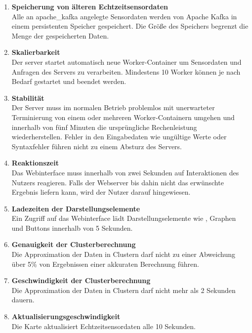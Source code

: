 \begin{enumerate}[label=\textbf{NF\arabic{enumi}0}]
	\item \textbf{Speicherung von älteren Echtzeitsensordaten}\\
	Alle an \gls{apache_kafka} angelegte Sensordaten werden von Apache Kafka in einem persistenten Speicher gespeichert. Die Größe des Speichers begrenzt die Menge der gespeicherten Daten.
	
	\item \textbf{Skalierbarkeit}\\
	Der \gls{server} startet automatisch neue Worker-Container um Sensordaten und Anfragen des Servers zu verarbeiten. Mindestens 10 Worker können je nach Bedarf gestartet und beendet werden.
	
	\item \textbf{Stabilität}\\  
	Der Server muss im normalen Betrieb problemlos mit unerwarteter Terminierung von einem oder mehreren Worker-Containern umgehen und innerhalb von fünf Minuten die ursprüngliche Rechenleistung wiederherstellen. Fehler in den Eingabedaten wie ungültige Werte oder Syntaxfehler führen nicht zu einem Absturz des Servers.
	
	\item \textbf{Reaktionszeit}\\
	Das Webinterface muss innerhalb von zwei Sekunden auf Interaktionen des Nutzers reagieren. Falls der Webserver bis dahin nicht das erwünschte Ergebnis liefern kann, wird der Nutzer darauf hingewiesen.
	
	\item \textbf{Ladezeiten der Darstellungselemente}\\
	Ein Zugriff auf das Webinterface lädt Darstellungselemente wie , Graphen und Buttons innerhalb von 5 Sekunden.
	
	\item \textbf{Genauigkeit der Clusterberechnung}\\
	Die Approximation der Daten in Clustern darf nicht zu einer Abweichung über 5\% von Ergebnissen einer akkuraten Berechnung führen.
	
	\item \textbf{Geschwindigkeit der Clusterberechnung}\\
	Die Approximation der Daten in Clustern darf nicht mehr als 2 Sekunden dauern.
	
	\item \textbf{Aktualisierungsgeschwindigkeit}\\
	Die Karte aktualisiert Echtzeitsensordaten alle 10 Sekunden.

\end{enumerate}
	